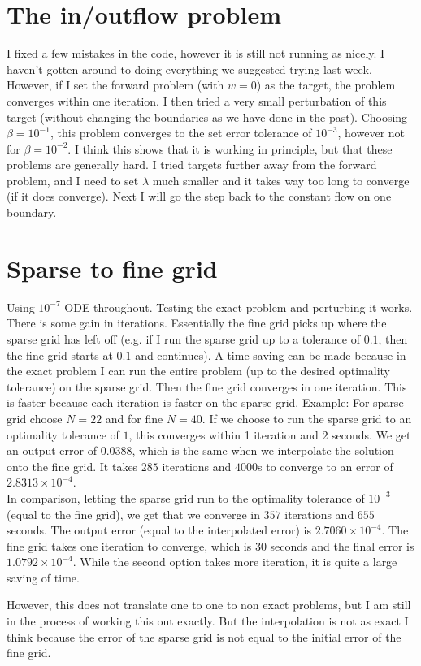 \documentclass[11pt, a4paper]{article}
\theoremstyle{definition}
\begin{document}
\section{The in/outflow problem}
	I fixed a few mistakes in the code, however it is still not running as nicely. I haven't gotten around to doing everything we suggested trying last week.
	However, if I set the forward problem (with $w=0$) as the target, the problem converges within one iteration. I then tried a very small perturbation of this target (without changing the boundaries as we have done in the past). Choosing $\beta = 10^{-1}$, this problem converges to the set error tolerance of $10^{-3}$, however not for $\beta = 10^{-2}$.
	I think this shows that it is working in principle, but that these problems are generally hard. I tried targets further away from the forward problem, and I need to set $\lambda$ much smaller and it takes way too long to converge (if it does converge).
	Next I will go the step back to the constant flow on one boundary.

\section{Sparse to fine grid}
Using $10^{-7}$ ODE throughout.
Testing the exact problem and perturbing it works. There is some gain in iterations. Essentially the fine grid picks up where the sparse grid has left off (e.g. if I run the sparse grid up to a tolerance of $0.1$, then the fine grid starts at $0.1$ and continues). A time saving can be made because in the exact problem I can run the entire problem (up to the desired optimality tolerance) on the sparse grid. Then the fine grid converges in one iteration. This is faster because each iteration is faster on the sparse grid.
Example: For sparse grid choose $N =22$ and for fine $N = 40$. If we choose to run the sparse grid to an optimality tolerance of $1$, this converges within 1 iteration and $2$ seconds. We get an output error of $0.0388$, which is the same when we interpolate the solution onto the fine grid. It takes $285$ iterations and $4000$s to converge to an error of $2.8313 \times 10^{-4}$.\\
In comparison, letting the sparse grid run to the optimality tolerance of $10^{-3}$ (equal to the fine grid), we get that we converge in $357$ iterations and $655$ seconds. The output error (equal to the interpolated error) is $2.7060 \times 10^{-4}$. The fine grid takes one iteration to converge, which is $30$ seconds and the final error is $1.0792 \times 10^{-4}$. While the second option takes more iteration, it is quite a large saving of time.   

However, this does not translate one to one to non exact problems, but I am still in the process of working this out exactly. But the interpolation is not as exact I think because the error of the sparse grid is not equal to the initial error of the fine grid. 	
	
	
	
	
	
	
	
	
\end{document}
